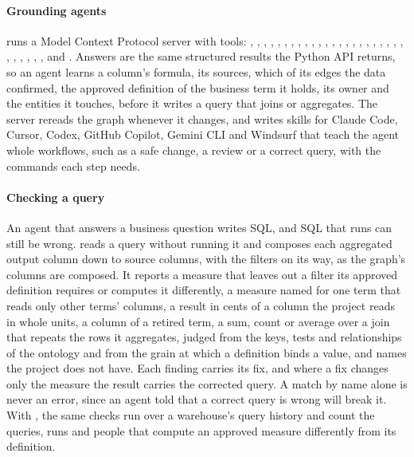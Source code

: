 \paragraph{Grounding agents}  runs a Model Context Protocol server with
\mcpTools{} tools: , , , , ,
, , , , , ,
, , , , , , , , , , , , ,
, , , , ,  and . Answers are the same structured results the Python API returns, so an
agent learns a column's formula, its sources, which of its edges the data confirmed, the approved
definition of the business term it holds, its owner and the entities it touches, before it writes
a query that joins or aggregates. The server rereads the graph whenever it changes, and
 writes skills for Claude Code, Cursor, Codex, GitHub Copilot, Gemini CLI and
Windsurf that teach the agent whole workflows, such as a safe change, a review or a correct query,
with the commands each step needs.

\paragraph{Checking a query} An agent that answers a business question writes SQL, and SQL that
runs can still be wrong.  reads a query without running it and composes
each aggregated output column down to source columns, with the filters on its way, as the graph's
columns are composed. It reports a measure that leaves out a filter its approved definition
requires or computes it differently, a measure named for one term that reads only other terms'
columns, a result in cents of a column the project reads in whole units, a column of a retired
term, a sum, count or average over a join that repeats the rows it aggregates, judged from the
keys, tests and relationships of the ontology and from the grain at which a definition binds a
value, and names the project does not have. Each finding carries its fix, and where a fix changes
only the measure the result carries the corrected query. A match by name alone is never
an error, since an agent told that a correct query is wrong will break it. With
, the same checks run over a warehouse's query history and count the queries,
runs and people that compute an approved measure differently from its definition.


